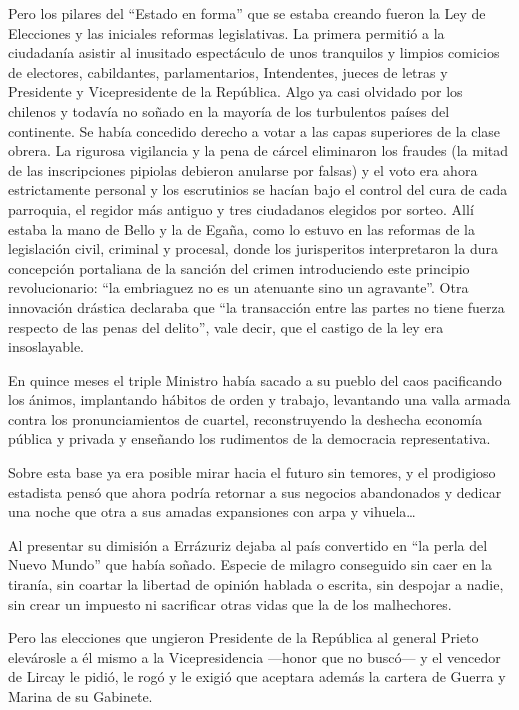 \documentclass[10pt,twoside,openright]{memoir}
\begin{document}
Pero los pilares del ``Estado en forma'' que se estaba creando fueron la
Ley de Elecciones y las iniciales reformas legislativas. La primera
permitió a la ciudadanía asistir al inusitado espectáculo de unos
tranquilos y limpios comicios de electores, cabildantes, parlamentarios,
Intendentes, jueces de letras y Presidente y Vicepresidente de la
República. Algo ya casi olvidado por los chilenos y todavía no soñado en
la mayoría de los turbulentos países del continente. Se había concedido
derecho a votar a las capas
superiores de la clase obrera. La
rigurosa vigilancia y la pena de cárcel eliminaron los fraudes (la mitad
de las inscripciones pipiolas debieron anularse por falsas) y el voto
era ahora estrictamente personal y los escrutinios se hacían bajo el
control del cura de cada parroquia, el regidor más antiguo y tres
ciudadanos elegidos por sorteo. Allí estaba la mano de Bello y la de
Egaña, como  lo estuvo en las
reformas de la legislación civil, criminal y procesal, donde los
jurisperitos interpretaron la dura concepción portaliana de la sanción
del crimen introduciendo este principio revolucionario: ``la embriaguez
no es un atenuante sino un agravante''. Otra innovación drástica
declaraba que ``la transacción entre las partes no tiene fuerza respecto
de las penas del delito'', vale decir, que el castigo de la ley era
insoslayable.

 En quince meses el triple Ministro
había sacado a su pueblo del caos pacificando los ánimos, implantando
hábitos de orden y trabajo, levantando una valla armada contra los
pronunciamientos de cuartel, reconstruyendo la deshecha economía pública
y privada y enseñando los rudimentos de la democracia representativa.

Sobre esta base ya era posible mirar hacia el futuro sin temores, y el
prodigioso estadista pensó que ahora podría retornar a sus negocios
abandonados y dedicar una noche que otra a sus amadas expansiones con
arpa y vihuela\ldots{}

Al presentar su dimisión a Errázuriz dejaba al país convertido en ``la
perla del Nuevo Mundo'' que había soñado. Especie de milagro conseguido
sin caer en la tiranía, sin coartar la libertad de opinión
hablada o escrita, sin despojar a
nadie, sin crear un impuesto ni sacrificar otras vidas que la de los
malhechores.

 Pero las elecciones que ungieron
Presidente de la República al general Prieto elevárosle a él mismo a la
Vicepresidencia ---honor que no buscó--- y el vencedor
de Lircay le pidió, le rogó y le
exigió que aceptara además la cartera de Guerra y Marina de su Gabinete.
\end{document}
